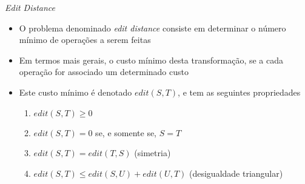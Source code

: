 \begin{frame}[fragile]{\it Edit Distance}

    \begin{itemize}
        \item O problema denominado \textit{edit distance} consiste em determinar o número mínimo 
            de operações a serem feitas

        \item Em termos mais gerais, o custo mínimo desta transformação, se a cada operação for 
            associado um determinado custo

        \item Este custo mínimo é denotado $edit(S, T)$, e tem as seguintes propriedades
        \begin{enumerate}
            \item $edit(S, T)\geq 0$
            \item $edit(S, T) = 0$ se, e somente se, $S = T$
            \item $edit(S, T) = edit(T, S)$ (simetria)
            \item $edit(S, T) \leq edit(S, U) + edit(U, T)$ (desigualdade triangular)
        \end{enumerate}
    \end{itemize}

\end{frame}

